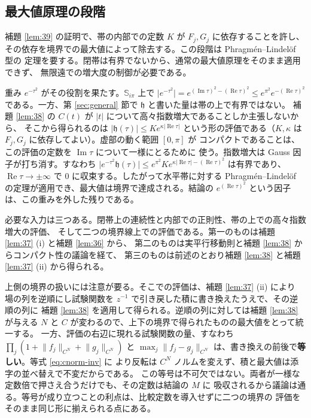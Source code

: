 \documentclass[11pt,a4paper]{article}
\newcommand{\Strip}{\mathbb{S}}
\newcommand{\CN}[1]{\lVert #1 \rVert_{C^{N}}}
\newcommand{\abs}[1]{\lvert #1 \rvert}
\theoremstyle{definition}
\begin{document}
\subsection{最大値原理の段階}
\label{sec:maxprinciple}

補題 \ref{lem:39} の証明で、帯の内部での定数 $K$ が $F_j, G_j$ に依存することを許し、
その依存を境界での最大値によって除去する。この段階は Phragm\'en--Lindel\"of 型の
定理を要する。閉帯は有界でないから、通常の最大値原理をそのまま適用できず、
無限遠での増大度の制御が必要である。

重み $e^{-\tau^2}$ がその役割を果たす。$\Strip_{i\pi}$ 上で
$\lvert e^{-\tau^2}\rvert = e^{(\operatorname{Im}\tau)^2 - (\operatorname{Re}\tau)^2}
\le e^{\pi^2} e^{-(\operatorname{Re}\tau)^2}$ である。一方、第 \ref{sec:general} 節で
$\mathfrak{h}$ と書いた量は帯の上で有界ではない。
補題 \ref{lem:38} の $C(t)$ が $\abs{t}$ について高々指数増大であることしか主張しないから、
そこから得られるのは
$\abs{\mathfrak{h}(\tau)} \le K e^{\kappa\abs{\operatorname{Re}\tau}}$
という形の評価である（$K, \kappa$ は $F_j, G_j$ に依存してよい）。虚部の動く範囲 $[0,\pi]$ が
コンパクトであることは、この評価の定数を $\operatorname{Im}\tau$ について一様にとるために
使う。指数増大は Gauss 因子が打ち消す。すなわち
$\abs{e^{-\tau^2}\mathfrak{h}(\tau)} \le e^{\pi^2} K e^{\kappa\abs{\operatorname{Re}\tau} - (\operatorname{Re}\tau)^2}$
は有界であり、$\operatorname{Re}\tau \to \pm\infty$ で $0$ に収束する。したがって水平帯に対する
Phragm\'en--Lindel\"of の定理が適用でき、最大値は境界で達成される。結論の
$e^{(\operatorname{Re}\tau)^2}$ という因子は、この重みを外した残りである。

必要な入力は三つある。閉帯上の連続性と内部での正則性、帯の上での高々指数増大の評価、
そして二つの境界線上での評価である。第一のものは補題 \ref{lem:37} (i) と補題 \ref{lem:36} から、
第二のものは実平行移動則と補題 \ref{lem:38} からコンパクト性の議論を経て、
第三のものは前述のとおり補題 \ref{lem:38} と補題 \ref{lem:37} (ii) から得られる。

上側の境界の扱いには注意が要る。そこでの評価は、補題 \ref{lem:37} (ii) により
場の列を逆順にし試験関数を $z^{-1}$ で引き戻した積に書き換えたうえで、その逆順の列に
補題 \ref{lem:38} を適用して得られる。逆順の列に対しては補題 \ref{lem:38} が与える
$N$ と $C$ が変わるので、上下の境界で得られたものの最大値をとって統一する。
一方、評価の右辺に現れる試験関数の量、すなわち $\prod_j (1 + \CN{f_j} + \CN{g_j})$ と
$\max_j \CN{f_j - g_j}$ は、書き換えの前後で\textbf{等しい}。等式 \eqref{eq:cnorm-inv} に
より反転は $C^N$ ノルムを変えず、積と最大値は添字の並べ替えで不変だからである。
この等号は不可欠ではない。両者が一様な定数倍で押さえ合うだけでも、その定数は結論の $M$ に
吸収されるから議論は通る。等号が成り立つことの利点は、比較定数を導入せずに二つの境界の
評価をそのまま同じ形に揃えられる点にある。
\end{document}
